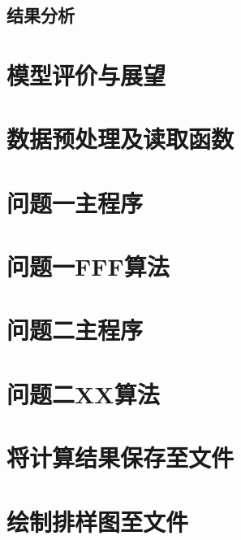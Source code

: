 \documentclass[bwprint]{gmcmthesis}
\begin{document}
\subsection{结果分析}

\section{模型评价与展望}


\newpage
\quad
\newpage





\cite{mittelbach_latex_2004,wright_latex3_2009,beeton_unicode_2008,vieth_experiences_2009}

\newpage
\appendix
\setcounter{page}{1} %
\section{数据预处理及读取函数}

\section{问题一主程序}

\section{问题一FFF算法}

\section{问题二主程序}

\section{问题二XX算法}

\section{将计算结果保存至文件}

\section{绘制排样图至文件}

\end{document}
